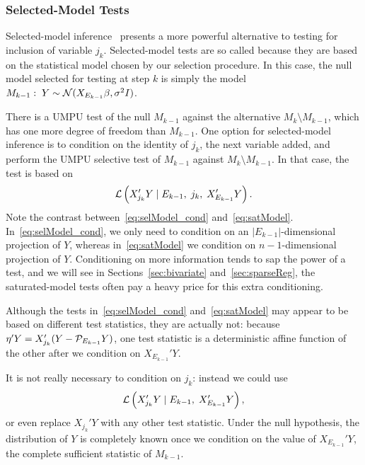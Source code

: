\documentclass{article}
\begin{document}
\subsubsection{Selected-Model Tests}
Selected-model inference~\citep{fithian2014optimal} presents a more powerful alternative to testing for inclusion of variable $j_k$. Selected-model tests are so called because they are based on the statistical model chosen by our selection procedure. In this case, the null model selected for testing at step $k$ is simply the model $M_{k-1}:\; Y \sim \mathcal{N}(X_{E_{k-1}}\beta, \sigma^2 I)$.

There is a UMPU test of the null $M_{k-1}$ against the alternative $M_{k}\setminus M_{k-1}$, which has one more degree of freedom than $M_{k-1}$. One option for selected-model inference is to condition on the identity of $j_k$, the next variable added, and perform the UMPU selective test of $M_{k-1}$ against $M_{k}\setminus M_{k-1}$. In that case, the test is based on
\begin{equation}\label{eq:selModel_cond}
\mathcal{L}\left(X_{j_k}'Y \mid E_{k-1}, \; j_k, \; X_{E_{k-1}}'Y\right).
\end{equation}
Note the contrast between~\eqref{eq:selModel_cond} and~\eqref{eq:satModel}. In~\eqref{eq:selModel_cond}, we only need to condition on an $|E_{k-1}|$-dimensional projection of $Y$, whereas in~\eqref{eq:satModel} we condition on $n-1$-dimensional projection of $Y$. Conditioning on more information tends to sap the power of a test, and we will see in Sections~\ref{sec:bivariate} and~\ref{sec:sparseReg}, the saturated-model tests often pay a heavy price for this extra conditioning.

Although the tests in~\eqref{eq:selModel_cond} and~\eqref{eq:satModel} may appear to be based on different test statistics, they are actually not: because $\eta'Y = X_{j_k}'(Y - \mathcal{P}_{E_{k-1}}Y)$, one test statistic is a deterministic affine function of the other after we condition on $X_{E_{k-1}}'Y$.

It is not really necessary to condition on $j_k$: instead we could use
\begin{equation}\label{eq:selModel_marg}
\mathcal{L}\left(X_{j_k}'Y \mid E_{k-1}, \; X_{E_{k-1}}'Y\right),
\end{equation}
or even replace $X_{j_k}'Y$ with any other test statistic. Under the null hypothesis, the distribution of $Y$ is completely known once we condition on the value of $X_{E_{k-1}}'Y$, the complete sufficient statistic of $M_{k-1}$.
\end{document}
